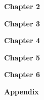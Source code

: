 \documentclass[12pt]{article}
\begin{document}
\newpage
{\bf\huge{Chapter 2}\par}


\newpage
{\bf\huge{Chapter 3}\par}


\newpage
{\bf\huge{Chapter 4}\par}


\newpage
{\bf\huge{Chapter 5}\par}


\newpage
{\bf\huge{Chapter 6}\par}


\newpage
{\bf\huge{Appendix}\par}


\newpage


\end{document}
